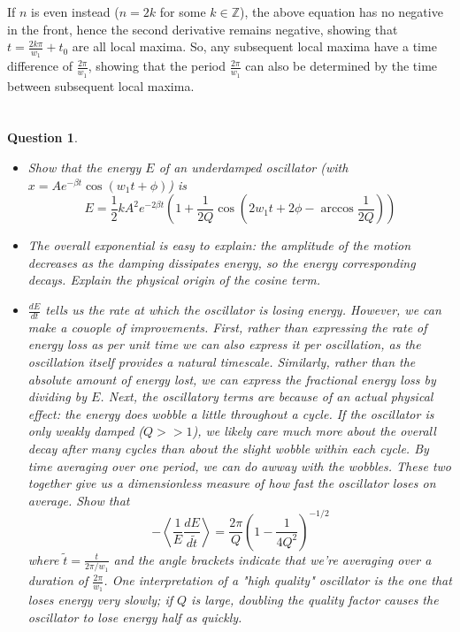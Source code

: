 \documentclass{article}
\newtheorem{question}{Question}
\newcommand{\ZZ}{\mathbb{Z}}
\begin{document}
If $n$ is even instead ($n=2k$ for some $k\in\ZZ$), the above equation has no negative in the front, hence the second derivative remains negative, showing that $t=\frac{2k \pi}{w_1}+t_0$ are all local maxima.
So, any subsequent local maxima have a time difference of $\frac{2\pi}{w_1}$, showing that the period $\frac{2\pi}{w_1}$ can also be determined by the time between subsequent local maxima.

\break

\section{}
\begin{question}\label{q2}
    
    \hfil

    \begin{itemize}
        \item[(a)] Show that the energy $E$ of an underdamped oscillator (with $x=Ae^{-\beta t}\cos(w_1 t+\phi)$) is 
        $$E=\frac{1}{2}kA^2e^{-2\beta t}\left(1+\frac{1}{2Q}\cos\left(2w_1 t+2\phi-\arccos\frac{1}{2Q}\right)\right)$$
        \item[(b)] The overall exponential is easy to explain: the amplitude of the motion decreases as the damping dissipates energy, so the energy corresponding decays. Explain the physical origin of the cosine term.
        \item[(c)] $\frac{dE}{dt}$ tells us the rate at which the oscillator is losing energy. However, we can make a couople of improvements. First, rather than expressing the rate of energy loss as \emph{per unit time} we can also express it \emph{per oscillation}, as the oscillation itself provides a natural timescale. Similarly, rather than the absolute amount of energy lost, we can express the fractional energy loss by dividing by $E$.
        Next, the oscillatory terms are because of an actual physical effect: the energy does wobble a little throughout a cycle. If the oscillator is only weakly damped ($Q>>1$), we likely care much more about the overall decay after many cycles than about the slight wobble within each cycle. By time averaging over one period, we can do awway with the wobbles. These two together give us a dimensionless measure of how fast the oscillator loses on average. Show that
        $$-\left<\frac{1}{E}\frac{dE}{d\tilde{t}}\right>=\frac{2\pi}{Q}\left(1-\frac{1}{4Q^2}\right)^{-1/2}$$
        where $\tilde{t}=\frac{t}{2\pi/w_1}$ and the angle brackets indicate that we're averaging over a duration of $\frac{2\pi}{w_1}$. One interpretation of a "high quality" oscillator is the one that loses energy very slowly; if $Q$ is large, doubling the quality factor causes the oscillator to lose energy half as quickly.
    \end{itemize}
\end{question}
\end{document}
